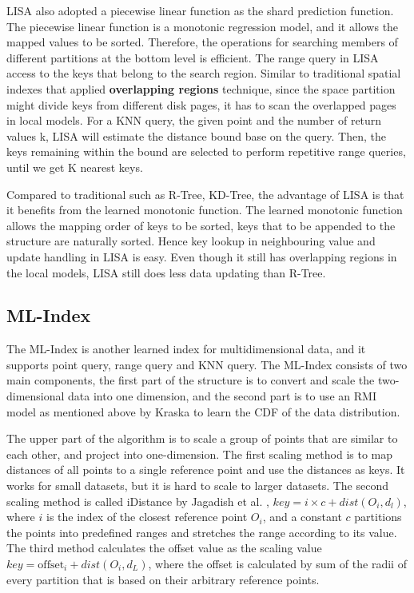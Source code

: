 LISA also adopted a piecewise linear function as the shard prediction function. The piecewise linear function is a monotonic regression model, and it allows the mapped values to be sorted. Therefore, the operations for searching members of different partitions at the bottom level is efficient. The range query in LISA access to the keys that belong to the search region. Similar to traditional spatial indexes that applied \textbf{overlapping regions} technique, since the space partition might divide keys from different disk pages, it has to scan the overlapped pages in local models. For a KNN query, the given point and the number of return values k, LISA will estimate the distance bound base on the query. Then, the keys remaining within the bound are selected to perform repetitive range queries, until we get K nearest keys. 

Compared to traditional such as R-Tree, KD-Tree, the advantage of LISA is that it benefits from the learned monotonic function. The learned monotonic function allows the mapping order of keys to be sorted, keys that to be appended to the structure are naturally sorted. Hence key lookup in neighbouring value and update handling in LISA is easy. Even though it still has overlapping regions in the local models, LISA still does less data updating than R-Tree. 

\subsection{ML-Index}
The ML-Index \cite{Davitkova:2020dx} is another learned index for multidimensional data, and it supports point query, range query and KNN query. The ML-Index consists of two main components, the first part of the structure is to convert and scale the two-dimensional data into one dimension, and the second part is to use an RMI model as mentioned above by Kraska to learn the CDF of the data distribution. 

The upper part of the algorithm is to scale a group of points that are similar to each other, and project into one-dimension. The first scaling method is to map distances of all points to a single reference point and use the distances as keys. It works for small datasets, but it is hard to scale to larger datasets. The second scaling method is called iDistance by Jagadish et al. \cite{jagadish2005idistance}, $key = i \times c + dist(O_i, d_l)$, where $i$ is the index of the closest reference point $O_i$, and a constant $c$ partitions the points into predefined ranges and stretches the range according to its value. The third method calculates the offset value as the scaling value $key = \text{offset}_i + dist(O_i, d_L)$, where the offset is calculated by sum of the radii of every partition that is based on their arbitrary reference points.  


